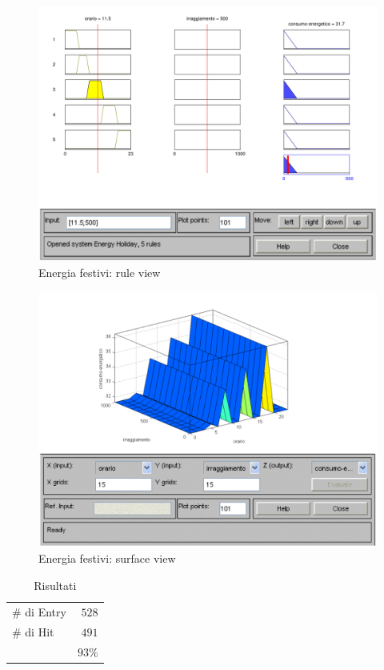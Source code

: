 \begin{figure}[htbp]
  \centering
  \includegraphics[scale=0.5]{images/fuzzy/energia_festivi_rule_view.pdf}
  \caption{Energia festivi: rule view}
\end{figure}

\begin{figure}[htbp]
  \centering
  \includegraphics[scale=0.5]{images/fuzzy/energia_festivi_surface_view.pdf}
  \caption{Energia festivi: surface view}
\end{figure}

\begin{table}
  \caption{Risultati}
  \centering
	\begin{tabular}{lr}
		\toprule
      \# di Entry & $ 528 $ \\
			\# di Hit   & $ 491 $ \\
		\midrule
			& $ 93\% $ \\
		\bottomrule
	\end{tabular}
\end{table}

\clearpage

